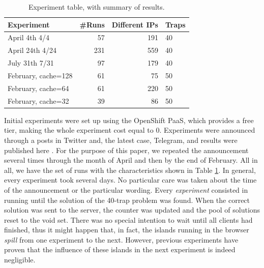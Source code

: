 \documentclass[letterpaper]{article}
\begin{document}
\begin{table}[htb]
\caption{Experiment table, with summary of results. \label{tab:runs}}
\begin{center}
\begin{tabular}{l|rrl}
\hline
Experiment & \#Runs & Different IPs & Traps \\
\hline
April 4th 4/4 & 57 & 191 & 40 \\
April 24th 4/24 &  231 & 559& 40  \\
July 31th 7/31 & 97 & 179 & 40 \\
\hline
February, cache=128 & 61 & 75 & 50  \\
February, cache=64 & 61 & 220 & 50  \\
February, cache=32 & 39 & 86 & 50  \\
\hline
\end{tabular}
\end{center}
\end{table}
%
Initial experiments were set up using the OpenShift
PaaS, which provides a free tier, making the whole experiment cost
equal to 0. Experiments were
announced through a posts in Twitter and, the latest case, Telegram, and
results were published here \citep{DBLP:conf/gecco/GuervosG15}. For the
purpose of this paper, we repeated the announcement several times
through the month of April and then by the end of February. All
in all, we have the set of runs with the characteristics shown in
Table \ref{tab:runs}. In general, every experiment took several
days. No particular care was taken about the time of the announcement
or the particular wording. Every {\em experiment} consisted in running
until the solution of the 40-trap problem was found. When the correct
solution was sent to the server, the counter was updated and the pool
of solutions reset to the void set. There was no special intention to wait
until all clients had finished, thus it might happen that, in fact,
the islands running in the browser {\em spill} from one experiment to
the next. However, previous experiments have proven that the influence
of these islands in the next experiment is indeed negligible.
\end{document}
